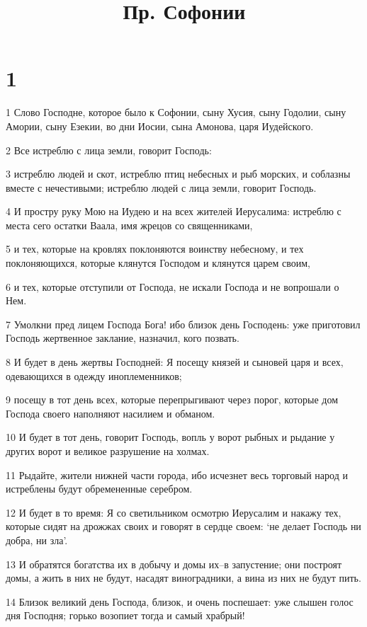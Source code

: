 

\title{Пр. Софонии}


\chapter{1}

\par 1 Слово Господне, которое было к Софонии, сыну Хусия, сыну Годолии, сыну Амории, сыну Езекии, во дни Иосии, сына Амонова, царя Иудейского.
\par 2 Все истреблю с лица земли, говорит Господь:
\par 3 истреблю людей и скот, истреблю птиц небесных и рыб морских, и соблазны вместе с нечестивыми; истреблю людей с лица земли, говорит Господь.
\par 4 И простру руку Мою на Иудею и на всех жителей Иерусалима: истреблю с места сего остатки Ваала, имя жрецов со священниками,
\par 5 и тех, которые на кровлях поклоняются воинству небесному, и тех поклоняющихся, которые клянутся Господом и клянутся царем своим,
\par 6 и тех, которые отступили от Господа, не искали Господа и не вопрошали о Нем.
\par 7 Умолкни пред лицем Господа Бога! ибо близок день Господень: уже приготовил Господь жертвенное заклание, назначил, кого позвать.
\par 8 И будет в день жертвы Господней: Я посещу князей и сыновей царя и всех, одевающихся в одежду иноплеменников;
\par 9 посещу в тот день всех, которые перепрыгивают через порог, которые дом Господа своего наполняют насилием и обманом.
\par 10 И будет в тот день, говорит Господь, вопль у ворот рыбных и рыдание у других ворот и великое разрушение на холмах.
\par 11 Рыдайте, жители нижней части города, ибо исчезнет весь торговый народ и истреблены будут обремененные серебром.
\par 12 И будет в то время: Я со светильником осмотрю Иерусалим и накажу тех, которые сидят на дрожжах своих и говорят в сердце своем: `не делает Господь ни добра, ни зла'.
\par 13 И обратятся богатства их в добычу и домы их--в запустение; они построят домы, а жить в них не будут, насадят виноградники, а вина из них не будут пить.
\par 14 Близок великий день Господа, близок, и очень поспешает: уже слышен голос дня Господня; горько возопиет тогда и самый храбрый!
